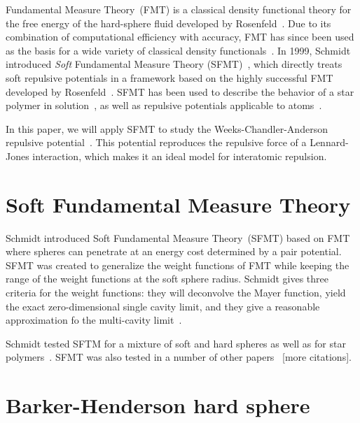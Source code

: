 \documentclass[letterpaper,twocolumn,amsmath,amssymb,prb]{revtex4-1}
\newcommand{\red}[1]{{\color{red} #1}}
\newcommand{\fixme}[1]{\red{[#1]}}
\begin{document}
Fundamental Measure Theory~(FMT) is a classical density functional
theory for the free energy of the hard-sphere fluid developed by
Rosenfeld~\cite{rosenfeld1989}.  Due to its combination of
computational efficiency with accuracy, FMT has since been used as the
basis for a wide variety of classical density
functionals~\cite{cuesta1997dimensional, hansen2009fundamental,
  marechal2013density}.
%
In 1999, Schmidt introduced \emph{Soft} Fundamental Measure Theory
(SFMT)~\cite{schmidt1999density}, which directly treats soft repulsive
potentials in a framework based on the highly successful FMT developed
by Rosenfeld~\cite{rosenfeld1989}.  SFMT has been used to describe the
behavior of a star polymer in solution~\cite{schmidt2000density,
  groh2001density, kim2001adsorption, sweatman2002fundamental}, as
well as repulsive potentials applicable to
atoms~\cite{schmidt2000fluid, sweatman2002fundamental}.


In this paper, we will apply SFMT to study the Weeks-Chandler-Anderson
repulsive potential~\cite{weeks1971}.  This potential reproduces the repulsive force of
a Lennard-Jones interaction, which makes it an ideal model for
interatomic repulsion.

\section{Soft Fundamental Measure Theory}

Schmidt introduced Soft Fundamental Measure Theory~(SFMT) based on
FMT~\cite{schmidt1999density} where spheres can penetrate at an
energy cost determined by a pair potential. SFMT was created to
generalize the weight functions of FMT while keeping the range of
the weight functions at the soft sphere radius. Schmidt gives three
criteria for the weight functions: they will deconvolve the Mayer
function, yield the exact zero-dimensional single cavity limit, and
they give a reasonable approximation fo the multi-cavity
limit~\cite{schmidt1999density}.

Schmidt tested SFTM for a mixture of soft and hard spheres as well as
for star polymers~\cite{schmidt2000density, groh2001density}. SFMT was
also tested in a number of other papers~\cite{rosenfeld2000fluid}
\fixme{more citations}.

\section{Barker-Henderson hard sphere}
\end{document}
